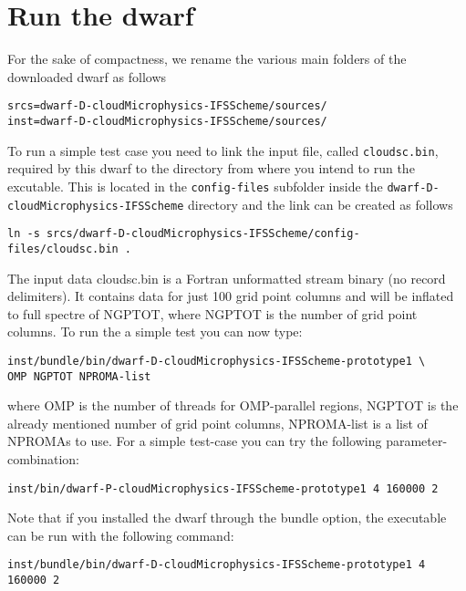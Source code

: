 \documentclass[
a4paper,     %
12pt,        %
article,
onecolumn,   %
openany,     %
]{memoir}
\newcommand{\inlsh}[1]{\texttt{#1}}
\newcommand{\inlsh}[1]{\tikz[anchor=base,baseline]\node[inner sep=2pt,
outer sep=0,draw=yellow!10,fill=yellow!10]{\texttt{#1}};}
\begin{document}


\section{Run the dwarf}
For the sake of compactness, we rename the various main 
folders of the downloaded dwarf as follows 
%
\begin{lstlisting}[style=BashStyle]
srcs=dwarf-D-cloudMicrophysics-IFSScheme/sources/
inst=dwarf-D-cloudMicrophysics-IFSScheme/sources/
\end{lstlisting}
%
To run a simple test case you need to link the input file, 
called \inlsh{cloudsc.bin}, required by this dwarf to the 
directory from where you intend to run the excutable.
This is located in the \inlsh{config-files} subfolder inside 
the \inlsh{dwarf-D-cloudMicrophysics-IFSScheme} directory 
and the link can be created as follows
%
\begin{lstlisting}[style=BashStyle]
ln -s srcs/dwarf-D-cloudMicrophysics-IFSScheme/config-files/cloudsc.bin .
\end{lstlisting}
%
The input data cloudsc.bin is a Fortran unformatted stream binary 
(no record delimiters). It contains data for just 100 grid point 
columns and will be inflated to full spectre of NGPTOT, where 
NGPTOT is the number of grid point columns. To run the a simple 
test you can now type:
%
\begin{lstlisting}[style=BashStyle]
inst/bundle/bin/dwarf-D-cloudMicrophysics-IFSScheme-prototype1 \
OMP NGPTOT NPROMA-list
\end{lstlisting}
%
where OMP is the number of threads for OMP-parallel regions, 
NGPTOT is the already mentioned number of grid point columns, 
NPROMA-list is a list of NPROMAs to use. For a simple test-case 
you can try the following parameter-combination:
%
\begin{lstlisting}[style=BashStyle]
inst/bin/dwarf-P-cloudMicrophysics-IFSScheme-prototype1 4 160000 2
\end{lstlisting}
%
Note that if you installed the dwarf through the bundle option, 
the executable can be run with the following command:
%
\begin{lstlisting}[style=BashStyle]
inst/bundle/bin/dwarf-D-cloudMicrophysics-IFSScheme-prototype1 4 160000 2
\end{lstlisting}
%
\end{document}
